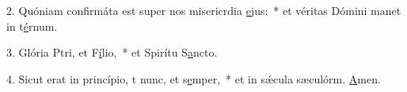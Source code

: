 2. Quóniam confirmáta est super nos misericrdia \uline{e}jus:~* et véritas Dómini manet in t\uline{é}rnum.\par 
3. Glória Ptri, et F\uline{í}lio,~* et Spirítu S\uline{a}ncto.\par 
4. Sicut erat in princípio, t nunc, et s\uline{e}mper,~* et in sǽcula sæculórm. \uline{A}men.\par 
